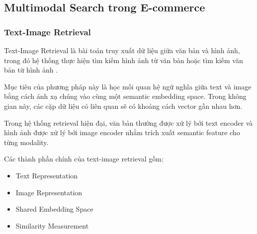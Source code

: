 

\subsection{Multimodal Search trong E-commerce}

\subsubsection{Text-Image Retrieval}

Text-Image Retrieval là bài toán truy xuất dữ liệu giữa văn bản và hình ảnh, trong đó hệ thống thực hiện tìm kiếm hình ảnh từ văn bản hoặc tìm kiếm văn bản từ hình ảnh \parencite{faghri2018vsepp}.

Mục tiêu của phương pháp này là học mối quan hệ ngữ nghĩa giữa text và image bằng cách ánh xạ chúng vào cùng một semantic embedding space. Trong không gian này, các cặp dữ liệu có liên quan sẽ có khoảng cách vector gần nhau hơn.

Trong hệ thống retrieval hiện đại, văn bản thường được xử lý bởi text encoder và hình ảnh được xử lý bởi image encoder nhằm trích xuất semantic feature cho từng modality.

Các thành phần chính của text-image retrieval gồm:
\begin{itemize}
    \item Text Representation
    \item Image Representation
    \item Shared Embedding Space
    \item Similarity Measurement
\end{itemize}

